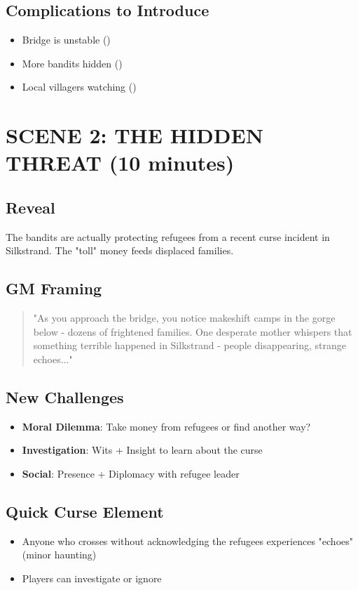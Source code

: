 \documentclass[11pt]{article}
\begin{document}
\subsection*{Complications to Introduce}
\begin{itemize}
\item Bridge is unstable ()
\item More bandits hidden ()
\item Local villagers watching ()
\end{itemize}

\section{SCENE 2: THE HIDDEN THREAT (10 minutes)}

\subsection*{Reveal}
The bandits are actually protecting refugees from a recent curse incident in Silkstrand. The "toll" money feeds displaced families.

\subsection*{GM Framing}
\begin{quote}
"As you approach the bridge, you notice makeshift camps in the gorge below - dozens of frightened families. One desperate mother whispers that something terrible happened in Silkstrand - people disappearing, strange echoes..."
\end{quote}

\subsection*{New Challenges}
\begin{itemize}
\item \textbf{Moral Dilemma}: Take money from refugees or find another way?
\item \textbf{Investigation}: Wits + Insight to learn about the curse
\item \textbf{Social}: Presence + Diplomacy with refugee leader
\end{itemize}

\subsection*{Quick Curse Element}
\begin{itemize}
\item Anyone who crosses without acknowledging the refugees experiences "echoes" (minor haunting)
\item Players can investigate or ignore
\end{itemize}
\end{document}
